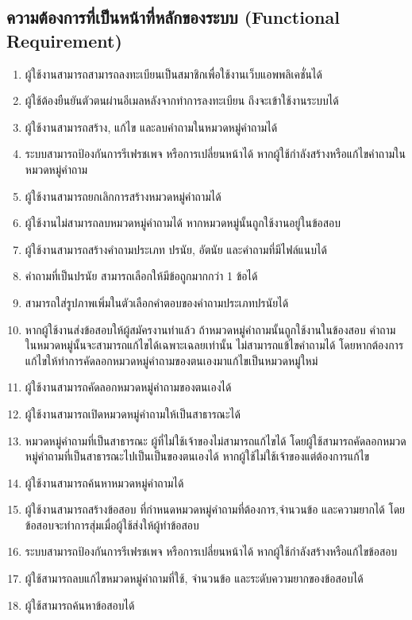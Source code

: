 \subsection{ความต้องการที่เป็นหน้าที่หลักของระบบ (Functional Requirement)}
\begin{enumerate}
  \item ผู้ใช้งานสามารถสามารถลงทะเบียนเป็นสมาชิกเพื่อใช้งานเว็บแอพพลิเคชั่นได้   
  \item ผู้ใช้ต้องยืนยันตัวตนผ่านอีเมลหลังจากทำการลงทะเบียน ถึงจะเข้าใช้งานระบบได้
  \item ผู้ใช้งานสามารถสร้าง, แก้ไข และลบคำถามในหมวดหมู่คำถามได้
  \item ระบบสามารถป้องกันการรีเฟรชเพจ หรือการเปลี่ยนหน้าได้ หากผู้ใช้กำลังสร้างหรือแก้ไขคำถามในหมวดหมู่คำถาม
  \item ผู้ใช้งานสามารถยกเลิกการสร้างหมวดหมู่คำถามได้
  \item ผู้ใช้งานไม่สามารถลบหมวดหมู่คำถามได้ หากหมวดหมู่นั้นถูกใช้งานอยู่ในข้อสอบ
  \item ผู้ใช้งานสามารถสร้างคำถามประเภท ปรนัย, อัตนัย และคำถามที่มีไฟล์แนบได้
  \item คำถามที่เป็นปรนัย สามารถเลือกให้มีข้อถูกมากกว่า 1 ข้อได้
  \item สามารถใส่รูปภาพเพิ่มในตัวเลือกคำตอบของคำถามประเภทปรนัยได้
  \item หากผู้ใช้งานส่งข้อสอบให้ผู้สมัครงานทำแล้ว ถ้าหมวดหมู่คำถามนั้นถูกใช้งานในข้องสอบ คำถามในหมวดหมู่นั้นจะสามารถแก้ไขได้เฉพาะเฉลยเท่านั้น ไม่สามารถแข้ไขคำถามได้ โดยหากต้องการแก้ไขให้ทำการคัดลอกหมวดหมู่คำถามของตนเองมาแก้ไขเป็นหมวดหมู่ใหม่
  \item ผู้ใช้งานสามารถคัดลอกหมวดหมู่คำถามของตนเองได้
  \item ผู้ใช้งานสามารถเปิดหมวดหมู่คำถามให้เป็นสาธารณะได้
  \item หมวดหมู่คำถามที่เป็นสาธารณะ ผู้ที่ไม่ใช้เจ้าของไม่สามารถแก้ไขได้ โดยผู้ใช้สามารถคัดลอกหมวดหมู่คำถามที่เป็นสาธารณะไปเป็นเป็นของตนเองได้ หากผู้ใช้ไม่ใช้เจ้าของแต่ต้องการแก้ไข
  \item ผู้ใช้งานสามารถค้นหาหมวดหมู่คำถามได้
  \item ผู้ใช้งานสามารถสร้างข้อสอบ ที่กำหนดหมวดหมู่คำถามที่ต้องการ,จำนวนข้อ และความยากได้ โดยข้อสอบจะทำการสุ่มเมื่อผู้ใช้ส่งให้ผู้ทำข้อสอบ
  \item ระบบสามารถป้องกันการรีเฟรชเพจ หรือการเปลี่ยนหน้าได้ หากผู้ใช้กำลังสร้างหรือแก้ไขข้อสอบ
  \item ผู้ใช้สามารถลบแก้ไขหมวดหมู่คำถามที่ใช้, จำนวนข้อ และระดับความยากของข้อสอบได้
  \item ผู้ใช้สามารถค้นหาข้อสอบได้

\end{enumerate}
